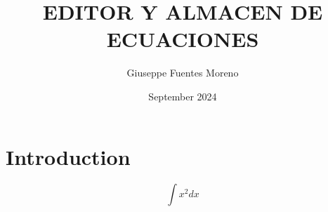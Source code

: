 \documentclass{article}
\title{EDITOR Y ALMACEN DE ECUACIONES}
\author{Giuseppe Fuentes Moreno}
\date{September 2024}
\begin{document}
\maketitle

\section{Introduction}

\begin{equation}
    \int x^{2} dx
\end{equation}
\end{document}
